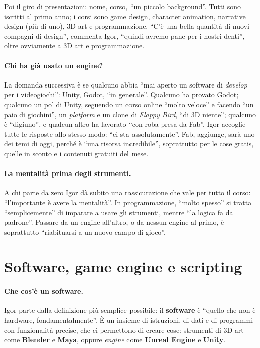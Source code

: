 Poi il giro di presentazioni: nome, corso, ``un piccolo background''. Tutti sono iscritti
al primo anno; i corsi sono game design, character animation, narrative design (più di
uno), 3D art e programmazione. ``C'è una bella quantità di nuovi compagni di design'',
commenta Igor, ``quindi avremo pane per i nostri denti'', oltre ovviamente a 3D art e
programmazione.

\paragraph{Chi ha già usato un engine?} La domanda successiva è se qualcuno abbia ``mai
aperto un software di \emph{develop} per i videogiochi'': Unity, Godot, ``in
generale''. Qualcuno ha provato Godot; qualcuno un po' di Unity, seguendo un corso
online ``molto veloce'' e facendo ``un paio di giochini'', un \emph{platform} e un clone
di \emph{Flappy Bird}, ``di 3D niente''; qualcuno è ``digiuno'', e qualcun altro ha
lavorato ``con roba presa da Fab''. Igor accoglie tutte le risposte allo stesso modo:
``ci sta assolutamente''. Fab, aggiunge, sarà uno dei temi di oggi, perché è ``una
risorsa incredibile'', soprattutto per le cose gratis, quelle in sconto e i contenuti
gratuiti del mese.

\paragraph{La mentalità prima degli strumenti.} A chi parte da zero Igor dà subito una
rassicurazione che vale per tutto il corso: ``l'importante è avere la mentalità''. In
programmazione, ``molto spesso'' si tratta ``semplicemente'' di imparare a usare gli
strumenti, mentre ``la logica fa da padrone''. Passare da un engine all'altro, o da
nessun engine al primo, è soprattutto ``riabituarsi a un nuovo campo di gioco''.

\section{Software, game engine e scripting}
\label{ue1:sec:engine}

\paragraph{Che cos'è un software.} Igor parte dalla definizione più semplice possibile:
il \textbf{software} è ``quello che non è hardware, fondamentalmente''. È un insieme di
istruzioni, di dati e di programmi con funzionalità precise, che ci permettono di
creare cose: strumenti di 3D art come \textbf{Blender} e \textbf{Maya}, oppure
\emph{engine} come \textbf{Unreal Engine} e \textbf{Unity}.

